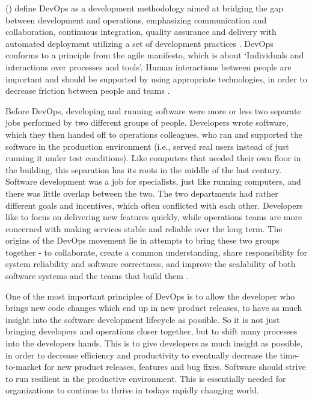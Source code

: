\citeauthor{devopsDefinition2016} (\citeyear{devopsDefinition2016})
define DevOps as
a development methodology aimed at bridging the gap between
development and operations, emphasizing communication and collaboration,
continuous integration, quality assurance and delivery with automated deployment
utilizing a set of development practices
\autocite{devopsDefinition2016}.
DevOps conforms to a principle from the agile manifesto,
which is about
\enquote*{Individuals and interactions over processes and tools}.
\autocite{agileManifestoFowler2001agile}
Human interactions between people are important
and should be supported by using appropriate technologies,
in order to decrease friction between people and teams
\autocite{practicalDevopsVerona2018practical}.

Before DevOps, developing and running software were more or less two separate jobs performed by two different groups of people.
Developers wrote software, which they then handed off to operations colleagues, who ran and supported the software in the production environment
(i.e., served real users instead of just running it under test conditions).
Like computers that needed their own floor in the building, this separation has its roots in the middle of the last century.
Software development was a job for specialists, just like running computers, and there was little overlap between the two.
The two departments had rather different goals and incentives, which often conflicted with each other. Developers like to focus on delivering new features quickly, while operations teams are more concerned with making services stable and reliable over the long term.
The origins of the DevOps movement lie in attempts to bring these two groups together - to collaborate, create a common understanding, share responsibility for system reliability and software correctness, and improve the scalability of both software systems and the teams that build them
\autocite{cloudNativeDevopsMitKubernetesArundel2019cloud}.


One of the most important principles of DevOps is
to allow the developer who brings new code changes
which end up in new product releases,
to have as much insight into the software development lifecycle as possible.
So it is not just bringing developers and operations closer together,
but to shift many processes into the developers hands.
This is to give developers as much insight as possible,
in order to decrease efficiency and productivity to eventually
decrease the time-to-market for new product releases, features and bug fixes.
Software should strive to run resilient in the productive environment.
This is essentially needed for organizations to continue to thrive in todays
rapidly changing world.

